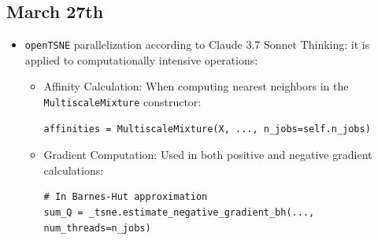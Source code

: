\documentclass[a4paper,12pt]{article}
\begin{document}
\subsection{March 27th}
\begin{itemize}
    \item \texttt{openTSNE} parallelization according to Claude 3.7 Sonnet Thinking:
    it is applied to computationally intensive operations:
    \begin{itemize}
        \item Affinity Calculation: When computing nearest neighbors in the\\ \texttt{MultiscaleMixture} constructor:
        \begin{verbatim}
affinities = MultiscaleMixture(X, ..., n_jobs=self.n_jobs)
        \end{verbatim}
        \item Gradient Computation: Used in both positive and negative gradient calculations:
        \begin{verbatim}
# In Barnes-Hut approximation
sum_Q = _tsne.estimate_negative_gradient_bh(..., num_threads=n_jobs)


\end{verbatim}
\end{itemize}
\end{itemize}
\end{document}
